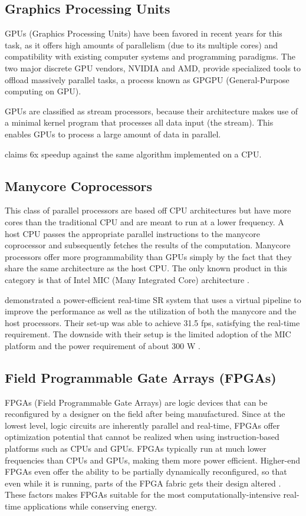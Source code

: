 \subsection{Graphics Processing Units}
GPUs (Graphics Processing Units) have been favored in recent years for this task, as it offers high amounts of parallelism (due to its multiple cores) and compatibility with existing computer systems and programming paradigms.
The two major discrete GPU vendors, NVIDIA and AMD, provide specialized tools to offload massively parallel tasks, a process known as GPGPU (General-Purpose computing on GPU).

GPUs are classified as stream processors, because their architecture makes use of a minimal kernel program that processes all data input (the stream). 
This enables GPUs to process a large amount of data in parallel. 

\cite{Wu2011} claims 6x speedup against the same algorithm implemented on a CPU. 

\subsection{Manycore Coprocessors}
This class of parallel processors are based off CPU architectures but have more cores than the traditional CPU and are meant to run at a lower frequency. 
A host CPU passes the appropriate parallel instructions to the manycore coprocessor and subsequently fetches the results of the computation.
Manycore processors offer more programmability than GPUs simply by the fact that they share the same architecture as the host CPU. 
The only known product in this category is that of Intel MIC (Many Integrated Core) architecture \citep{Intel2014}.

\cite{Ishizaka2013} demonstrated a power-efficient real-time SR system that uses a virtual pipeline to improve the performance as well as the utilization of both the manycore and the host processors. 
Their set-up was able to achieve 31.5 fps, satisfying the real-time requirement.
The downside with their setup is the limited adoption of the MIC platform and the power requirement of about 300 W \citep{Intel2014}.


\subsection{Field Programmable Gate Arrays (FPGAs)}
FPGAs (Field Programmable Gate Arrays) are logic devices that can be reconfigured by a designer on the field after being manufactured.
Since at the lowest level, logic circuits are inherently parallel and real-time, FPGAs offer optimization potential that cannot be realized when using instruction-based platforms such as CPUs and GPUs. FPGAs typically run at much lower frequencies than CPUs and GPUs, making them more power efficient.
Higher-end FPGAs even offer the ability to be partially dynamically reconfigured, so that even while it is running, parts of the FPGA fabric gets their design altered \citep{Dye2012}.
These factors makes FPGAs suitable for the most computationally-intensive real-time applications while conserving energy.
	
